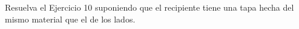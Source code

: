 \item Resuelva el Ejercicio 10 suponiendo que el recipiente tiene una tapa hecha del mismo material que el de los lados.
